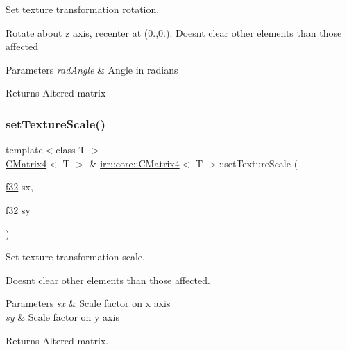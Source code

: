 Set texture transformation rotation. 

Rotate about z axis, recenter at (0.,0.). Doesn\textquotesingle{}t clear other elements than those affected 
\begin{DoxyParams}{Parameters}
{\em rad\+Angle} & Angle in radians \\
\hline
\end{DoxyParams}
\begin{DoxyReturn}{Returns}
Altered matrix 
\end{DoxyReturn}
\mbox{\label{classirr_1_1core_1_1CMatrix4_aed32a7a8da9c4cee5babe8f6b4aa7dd4}} 
\subsubsection{\texorpdfstring{set\+Texture\+Scale()}{setTextureScale()}\hspace{0.1cm}{\footnotesize\ttfamily [1/2]}}
{\footnotesize\ttfamily template$<$class T $>$ \\
\hyperlink{classirr_1_1core_1_1CMatrix4}{C\+Matrix4}$<$ T $>$ \& \hyperlink{classirr_1_1core_1_1CMatrix4}{irr\+::core\+::\+C\+Matrix4}$<$ T $>$\+::set\+Texture\+Scale (\begin{DoxyParamCaption}\item[{\hyperlink{namespaceirr_a0277be98d67dc26ff93b1a6a1d086b07}{f32}}]{sx,  }\item[{\hyperlink{namespaceirr_a0277be98d67dc26ff93b1a6a1d086b07}{f32}}]{sy }\end{DoxyParamCaption})\hspace{0.3cm}{\ttfamily [inline]}}



Set texture transformation scale. 

Doesn\textquotesingle{}t clear other elements than those affected. 
\begin{DoxyParams}{Parameters}
{\em sx} & Scale factor on x axis \\
\hline
{\em sy} & Scale factor on y axis \\
\hline
\end{DoxyParams}
\begin{DoxyReturn}{Returns}
Altered matrix. 
\end{DoxyReturn}
\mbox{\label{classirr_1_1core_1_1CMatrix4_aa42d504d84e1d43b0a6563914c8dbc67}} 
